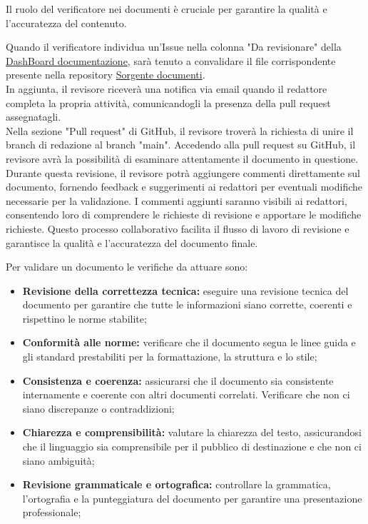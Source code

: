Il ruolo del verificatore nei documenti è cruciale per garantire la qualità e l'accuratezza del contenuto.

Quando il verificatore individua un'Issue nella colonna "Da revisionare" della \href{https://github.com/orgs/ByteOps-swe/projects/1/views/1}{DashBoard documentazione}, sarà tenuto a convalidare il file corrispondente presente nella repository \href{https://github.com/ByteOps-swe/Sorgente-documenti}{Sorgente documenti}. \\
In aggiunta, il revisore riceverà una notifica via email quando il redattore completa la propria attività, comunicandogli la presenza della pull request assegnatagli.\\
Nella sezione "Pull request" di GitHub, il revisore troverà la richiesta di unire il branch di redazione al branch "main". Accedendo alla pull request su GitHub, il revisore avrà la possibilità di esaminare attentamente il documento in questione. Durante questa revisione, il revisore potrà aggiungere commenti direttamente sul documento, fornendo feedback e suggerimenti ai redattori per eventuali modifiche necessarie per la validazione. I commenti aggiunti saranno visibili ai redattori, consentendo loro di comprendere le richieste di revisione e apportare le modifiche richieste. Questo processo collaborativo facilita il flusso di lavoro di revisione e garantisce la qualità e l'accuratezza del documento finale.

\vspace{0.3cm}

Per validare un documento le verifiche da attuare sono:
\begin{itemize}
    \item \textbf{Revisione della correttezza tecnica:} 
        eseguire una revisione tecnica del documento per garantire che tutte le informazioni siano corrette, coerenti e rispettino le norme stabilite;
    \item \textbf{Conformità alle norme:} 
        verificare che il documento segua le linee guida e gli standard prestabiliti per la formattazione, la struttura e lo stile;
    \item \textbf{Consistenza e coerenza:} 
        assicurarsi che il documento sia consistente internamente e coerente con altri documenti correlati. Verificare che non ci siano discrepanze o contraddizioni;
    \item \textbf{Chiarezza e comprensibilità:} 
        valutare la chiarezza del testo, assicurandosi che il linguaggio sia comprensibile per il pubblico di destinazione e che non ci siano ambiguità;
    \item \textbf{Revisione grammaticale e ortografica:} 
        controllare la grammatica, l'ortografia e la punteggiatura del documento per garantire una presentazione professionale;
\end{itemize}

